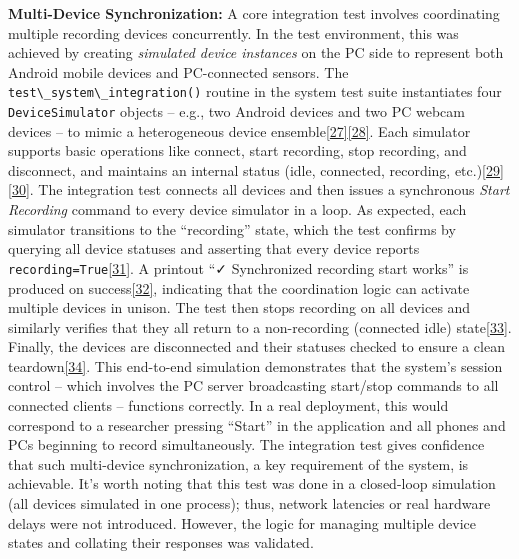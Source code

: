 \documentclass[12pt,a4paper]{article}
\begin{document}
\textbf{Multi-Device Synchronization:} A core integration test involves coordinating multiple recording devices concurrently. In the test environment, this was achieved by creating \emph{simulated device instances} on the PC side to represent both Android mobile devices and PC-connected sensors. The \passthrough{\lstinline!test\_system\_integration()!} routine in the system test suite instantiates four \passthrough{\lstinline!DeviceSimulator!} objects -- e.g., two Android devices and two PC webcam devices -- to mimic a heterogeneous device ensemble\href{https://github.com/buccancs/bucika_gsr/blob/7048f7f6a7536f5cd577ed2184800d3dad97fd08/PythonApp/system_test.py\#L269-L278}{{[}27{]}}\href{https://github.com/buccancs/bucika_gsr/blob/7048f7f6a7536f5cd577ed2184800d3dad97fd08/PythonApp/system_test.py\#L364-L372}{{[}28{]}}. Each simulator supports basic operations like connect, start recording, stop recording, and disconnect, and maintains an internal status (idle, connected, recording, etc.)\href{https://github.com/buccancs/bucika_gsr/blob/7048f7f6a7536f5cd577ed2184800d3dad97fd08/PythonApp/system_test.py\#L364-L373}{{[}29{]}}\href{https://github.com/buccancs/bucika_gsr/blob/7048f7f6a7536f5cd577ed2184800d3dad97fd08/PythonApp/system_test.py\#L376-L385}{{[}30{]}}. The integration test connects all devices and then issues a synchronous \emph{Start Recording} command to every device simulator in a loop. As expected, each simulator transitions to the ``recording'' state, which the test confirms by querying all device statuses and asserting that every device reports \passthrough{\lstinline!recording=True!}\href{https://github.com/buccancs/bucika_gsr/blob/7048f7f6a7536f5cd577ed2184800d3dad97fd08/PythonApp/system_test.py\#L417-L425}{{[}31{]}}. A printout ``✓ Synchronized recording start works'' is produced on success\href{https://github.com/buccancs/bucika_gsr/blob/7048f7f6a7536f5cd577ed2184800d3dad97fd08/PythonApp/system_test.py\#L414-L422}{{[}32{]}}, indicating that the coordination logic can activate multiple devices in unison. The test then stops recording on all devices and similarly verifies that they all return to a non-recording (connected idle) state\href{https://github.com/buccancs/bucika_gsr/blob/7048f7f6a7536f5cd577ed2184800d3dad97fd08/PythonApp/system_test.py\#L428-L436}{{[}33{]}}. Finally, the devices are disconnected and their statuses checked to ensure a clean teardown\href{https://github.com/buccancs/bucika_gsr/blob/7048f7f6a7536f5cd577ed2184800d3dad97fd08/PythonApp/system_test.py\#L433-L440}{{[}34{]}}. This end-to-end simulation demonstrates that the system's session control -- which involves the PC server broadcasting start/stop commands to all connected clients -- functions correctly. In a real deployment, this would correspond to a researcher pressing ``Start'' in the application and all phones and PCs beginning to record simultaneously. The integration test gives confidence that such multi-device synchronization, a key requirement of the system, is achievable. It's worth noting that this test was done in a closed-loop simulation (all devices simulated in one process); thus, network latencies or real hardware delays were not introduced. However, the logic for managing multiple device states and collating their responses was validated.
\end{document}
